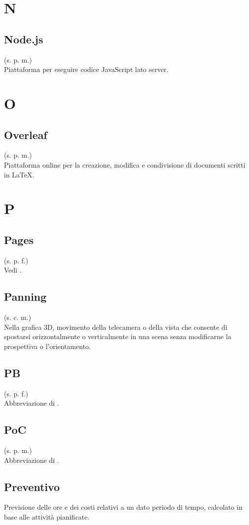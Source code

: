 \section{N}
    \subsection{Node.js}
    (s. p. m.)\\
    Piattaforma per eseguire codice JavaScript lato server.
\pagebreak
\section{O}
    \subsection{Overleaf}
    (s. p. m.)\\
    Piattaforma online per la creazione, modifica e condivisione di documenti 
    scritti in LaTeX.
\pagebreak
\section{P}
    \subsection{Pages}
    (s. p. f.)\\
    Vedi .
    \subsection{Panning}
    (s. c. m.)\\
    Nella grafica 3D, movimento della telecamera o della vista che consente 
    di spostarsi orizzontalmente o verticalmente in una scena senza modificarne 
    la prospettiva o l'orientamento.
    \subsection{PB}
    \label{PB}
    (s. p. f.)\\
    Abbreviazione di .
    \subsection{PoC}
    (s. p. m.)\\
    Abbreviazione di .
    \subsection{Preventivo}
    Previsione delle ore e dei costi relativi a un dato periodo di tempo,
    calcolato in base alle attività pianificate.
